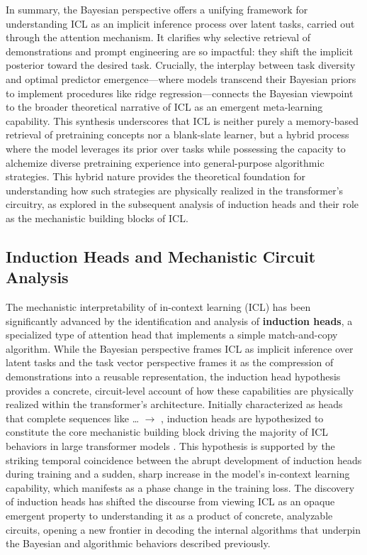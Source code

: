 \documentclass[11pt]{article}
\begin{document}
In summary, the Bayesian perspective offers a unifying framework for understanding ICL as an implicit inference process over latent tasks, carried out through the attention mechanism. It clarifies why selective retrieval of demonstrations and prompt engineering are so impactful: they shift the implicit posterior toward the desired task. Crucially, the interplay between task diversity and optimal predictor emergence---where models transcend their Bayesian priors to implement procedures like ridge regression---connects the Bayesian viewpoint to the broader theoretical narrative of ICL as an emergent meta-learning capability. This synthesis underscores that ICL is neither purely a memory-based retrieval of pretraining concepts nor a blank-slate learner, but a hybrid process where the model leverages its prior over tasks while possessing the capacity to alchemize diverse pretraining experience into general-purpose algorithmic strategies. This hybrid nature provides the theoretical foundation for understanding how such strategies are physically realized in the transformer's circuitry, as explored in the subsequent analysis of induction heads and their role as the mechanistic building blocks of ICL.

\subsection{Induction Heads and Mechanistic Circuit Analysis}

The mechanistic interpretability of in-context learning (ICL) has been significantly advanced by the identification and analysis of \textbf{induction heads}, a specialized type of attention head that implements a simple match-and-copy algorithm. While the Bayesian perspective frames ICL as implicit inference over latent tasks and the task vector perspective frames it as the compression of demonstrations into a reusable representation, the induction head hypothesis provides a concrete, circuit-level account of how these capabilities are physically realized within the transformer's architecture. Initially characterized as heads that complete sequences like \cite{ref52}\cite{ref53} \ldots{} \cite{ref52} \(\rightarrow\) \cite{ref53}, induction heads are hypothesized to constitute the core mechanistic building block driving the majority of ICL behaviors in large transformer models \cite{ref54}. This hypothesis is supported by the striking temporal coincidence between the abrupt development of induction heads during training and a sudden, sharp increase in the model's in-context learning capability, which manifests as a phase change in the training loss. The discovery of induction heads has shifted the discourse from viewing ICL as an opaque emergent property to understanding it as a product of concrete, analyzable circuits, opening a new frontier in decoding the internal algorithms that underpin the Bayesian and algorithmic behaviors described previously.
\end{document}
